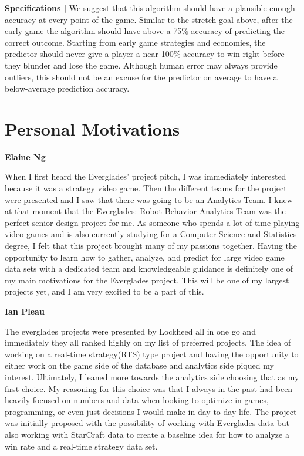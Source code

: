 \documentclass[a4paper,12pt]{report}
\newcommand{\msection}[1]{\noindent\textbf{#1}}
\begin{document}
\textbf{Specifications |} We suggest that this algorithm should have a plausible enough accuracy at every point of the game. Similar to the stretch goal above, after the early game the algorithm should have above a 75\% accuracy of predicting the correct outcome. Starting from early game strategies and economies, the predictor should never give a player a near 100\% accuracy to win right before they blunder and lose the game. Although human error may always provide outliers, this should not be an excuse for the predictor on average to have a below-average prediction accuracy.  

\section{Personal Motivations}

\msection{Elaine Ng}

When I first heard the Everglades’ project pitch, I was immediately interested because it was a strategy video game. Then the different teams for the project were presented and I saw that there was going to be an Analytics Team. I knew at that moment that the Everglades: Robot Behavior Analytics Team was the perfect senior design project for me. As someone who spends a lot of time playing video games and is also currently studying for a Computer Science and Statistics degree, I felt that this project brought many of my passions together. Having the opportunity to learn how to gather, analyze, and predict for large video game data sets with a dedicated team and knowledgeable guidance is definitely one of my main motivations for the Everglades project. This will be one of my largest projects yet, and I am very excited to be a part of this.

\msection{Ian Pleau}

The everglades projects were presented by Lockheed all in one go and immediately they all ranked highly on my list of preferred projects. The idea of working on a real-time strategy(RTS) type project and having the opportunity to either work on the game side of the database and analytics side piqued my interest. Ultimately, I leaned more towards the analytics side choosing that as my first choice. My reasoning for this choice was that I always in the past had been heavily focused on numbers and data when looking to optimize in games, programming, or even just decisions I would make in day to day life. The project was initially proposed with the possibility of working with Everglades data but also working with StarCraft data to create a baseline idea for how to analyze a win rate and a real-time strategy data set.
\end{document}
